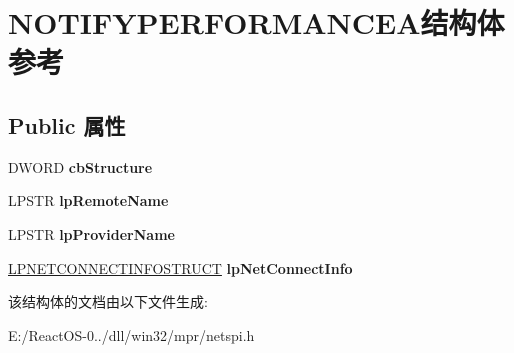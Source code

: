 \hypertarget{struct_n_o_t_i_f_y_p_e_r_f_o_r_m_a_n_c_e_a}{}\section{N\+O\+T\+I\+F\+Y\+P\+E\+R\+F\+O\+R\+M\+A\+N\+C\+E\+A结构体 参考}
\label{struct_n_o_t_i_f_y_p_e_r_f_o_r_m_a_n_c_e_a}
\subsection*{Public 属性}
\begin{DoxyCompactItemize}
\item 
\mbox{\label{struct_n_o_t_i_f_y_p_e_r_f_o_r_m_a_n_c_e_a_a003b6f3fff2b9a9a6ee768318dd13c83}} 
D\+W\+O\+RD {\bfseries cb\+Structure}
\item 
\mbox{\label{struct_n_o_t_i_f_y_p_e_r_f_o_r_m_a_n_c_e_a_ac4d1732d7f7410a6ab79eef3245bea34}} 
L\+P\+S\+TR {\bfseries lp\+Remote\+Name}
\item 
\mbox{\label{struct_n_o_t_i_f_y_p_e_r_f_o_r_m_a_n_c_e_a_a69217d717ec6f4982765168c11d00bd7}} 
L\+P\+S\+TR {\bfseries lp\+Provider\+Name}
\item 
\mbox{\label{struct_n_o_t_i_f_y_p_e_r_f_o_r_m_a_n_c_e_a_aa069f2e2a42c79c7da5b58cdb77f571c}} 
\hyperlink{struct___n_e_t_c_o_n_n_e_c_t_i_n_f_o_s_t_r_u_c_t}{L\+P\+N\+E\+T\+C\+O\+N\+N\+E\+C\+T\+I\+N\+F\+O\+S\+T\+R\+U\+CT} {\bfseries lp\+Net\+Connect\+Info}
\end{DoxyCompactItemize}


该结构体的文档由以下文件生成\+:\begin{DoxyCompactItemize}
\item 
E\+:/\+React\+O\+S-\/0../dll/win32/mpr/netspi.\+h\end{DoxyCompactItemize}
